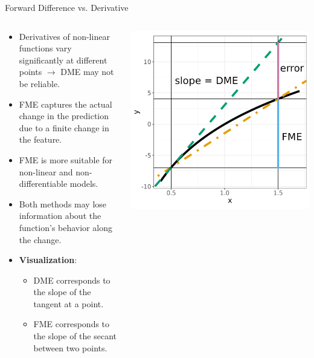 \documentclass[11pt,compress,t,notes=noshow, aspectratio=169, xcolor=table]{beamer}
\begin{document}
\begin{frame}{Forward Difference vs. Derivative}
\begin{columns}[T]
\begin{column}{0.65\textwidth}
\begin{itemize}
\item Derivatives of non-linear functions vary significantly at different points $\rightarrow$ DME may not be reliable.
\item FME captures the actual change in the prediction due to a finite change in the feature.
\item FME is more suitable for non-linear and non-differentiable models.
\item Both methods may lose information about the function's behavior along the change.
\item \textbf{Visualization}:
\begin{itemize}
\item DME corresponds to the slope of the tangent at a point.
\item FME corresponds to the slope of the secant between two points.
\end{itemize}
\end{itemize}
\end{column}
\begin{column}{0.35\textwidth}
\includegraphics[width=\textwidth]{figure-man/derivative_me_error.png}

\end{column}
\end{columns}
\end{frame}
\end{document}
